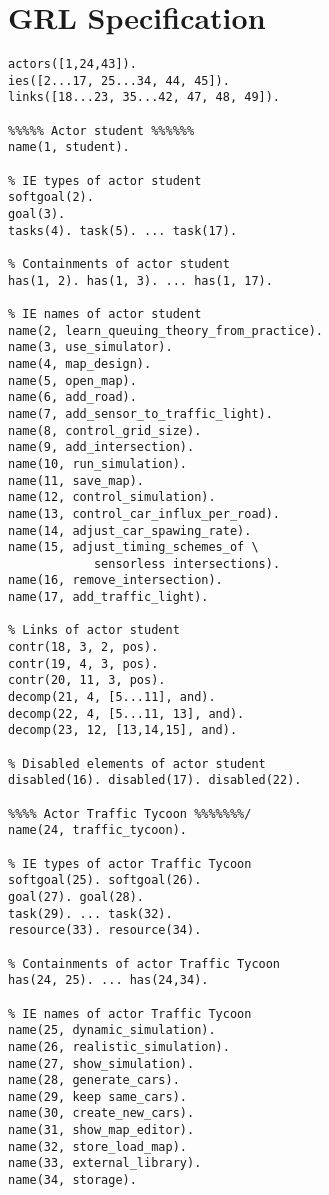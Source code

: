 \section{GRL Specification}
\label{appendix:grlspec}

\vspace{-0.5cm}

\begin{multicols}{2}
\begin{Verbatim}[fontsize=\scriptsize]
%% GRL Elements
actors([1,24,43]).
ies([2...17, 25...34, 44, 45]).
links([18...23, 35...42, 47, 48, 49]).

%%%%% Actor student %%%%%%
name(1, student).

% IE types of actor student
softgoal(2).
goal(3).
tasks(4). task(5). ... task(17).

% Containments of actor student
has(1, 2). has(1, 3). ... has(1, 17).

% IE names of actor student
name(2, learn_queuing_theory_from_practice).
name(3, use_simulator).
name(4, map_design).
name(5, open_map).
name(6, add_road).
name(7, add_sensor_to_traffic_light).
name(8, control_grid_size).
name(9, add_intersection).
name(10, run_simulation).
name(11, save_map).
name(12, control_simulation).
name(13, control_car_influx_per_road).
name(14, adjust_car_spawing_rate).
name(15, adjust_timing_schemes_of \
            sensorless intersections).
name(16, remove_intersection).
name(17, add_traffic_light).

% Links of actor student
contr(18, 3, 2, pos).
contr(19, 4, 3, pos).
contr(20, 11, 3, pos).
decomp(21, 4, [5...11], and).
decomp(22, 4, [5...11, 13], and).
decomp(23, 12, [13,14,15], and).

% Disabled elements of actor student
disabled(16). disabled(17). disabled(22).

%%%% Actor Traffic Tycoon %%%%%%%/
name(24, traffic_tycoon).

% IE types of actor Traffic Tycoon
softgoal(25). softgoal(26).
goal(27). goal(28).
task(29). ... task(32).
resource(33). resource(34).

% Containments of actor Traffic Tycoon
has(24, 25). ... has(24,34).

% IE names of actor Traffic Tycoon
name(25, dynamic_simulation).
name(26, realistic_simulation).
name(27, show_simulation).
name(28, generate_cars).
name(29, keep same_cars).
name(30, create_new_cars).
name(31, show_map_editor).
name(32, store_load_map).
name(33, external_library).
name(34, storage).


\end{Verbatim}
\end{multicols}
